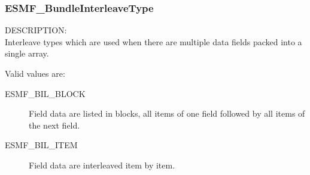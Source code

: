
\subsubsection{ESMF\_BundleInterleaveType}
 
{\sf DESCRIPTION:\\}
Interleave types which are used when there are multiple data fields
packed into a single array.

Valid values are:
\begin{description}
   \item [ESMF\_BIL\_BLOCK]
         Field data are listed in blocks, all items of one field followed
         by all items of the next field.
   \item [ESMF\_BIL\_ITEM]
         Field data are interleaved item by item.
\end{description}


